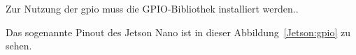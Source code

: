 Zur Nutzung der \ac{gpio} muss die GPIO-Bibliothek installiert  werden.\cite{GitHubGPIO:2020}.

\medskip

Das sogenannte Pinout des Jetson Nano ist in dieser Abbildung~\ref{Jetson:gpio} zu sehen.

%
%   
%
%






